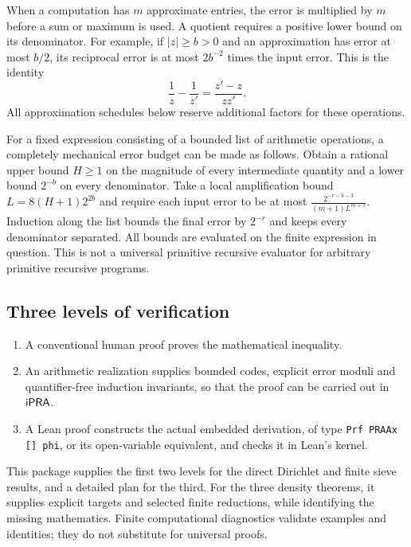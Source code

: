 When a computation has $m$ approximate entries, the error is multiplied by $m$ before a sum or maximum is used. A quotient requires a positive lower bound on its denominator. For example, if $|z|\geq b>0$ and an approximation has error at most $b/2$, its reciprocal error is at most $2b^{-2}$ times the input error. This is the identity
\[
 \frac1z-\frac1{z'}=\frac{z'-z}{zz'}.
\]
All approximation schedules below reserve additional factors for these operations.

For a fixed expression consisting of a bounded list of arithmetic operations, a completely mechanical error budget can be made as follows. Obtain a rational upper bound $H\geq1$ on the magnitude of every intermediate quantity and a lower bound $2^{-b}$ on every denominator. Take a local amplification bound
$L=8(H+1)2^{2b}$ and require each input error to be at most
$\frac{2^{-r-b-3}}{(m+1)L^{m+1}}$. Induction along the list bounds the final error by $2^{-r}$ and keeps every denominator separated. All bounds are evaluated on the finite expression in question. This is not a universal primitive recursive evaluator for arbitrary primitive recursive programs.

\subsection{Three levels of verification}

\begin{enumerate}
\item A conventional human proof proves the mathematical inequality.
\item An arithmetic realization supplies bounded codes, explicit error moduli and quantifier-free induction invariants, so that the proof can be carried out in $\mathsf{iPRA}$.
\item A Lean proof constructs the actual embedded derivation, of type \texttt{Prf PRAAx [] phi}, or its open-variable equivalent, and checks it in Lean's kernel.
\end{enumerate}

This package supplies the first two levels for the direct Dirichlet and finite sieve results, and a detailed plan for the third. For the three density theorems, it supplies explicit targets and selected finite reductions, while identifying the missing mathematics. Finite computational diagnostics validate examples and identities; they do not substitute for universal proofs.
